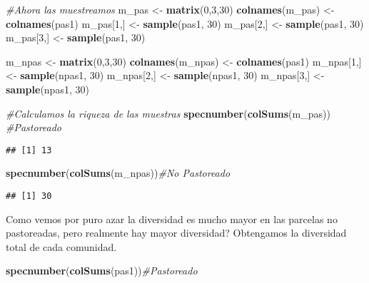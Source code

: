 \documentclass[]{book}
\newenvironment{Shaded}{\begin{snugshade}}{\end{snugshade}}
\newcommand{\KeywordTok}[1]{\textcolor[rgb]{0.13,0.29,0.53}{\textbf{{#1}}}}
\newcommand{\DecValTok}[1]{\textcolor[rgb]{0.00,0.00,0.81}{{#1}}}
\newcommand{\StringTok}[1]{\textcolor[rgb]{0.31,0.60,0.02}{{#1}}}
\newcommand{\CommentTok}[1]{\textcolor[rgb]{0.56,0.35,0.01}{\textit{{#1}}}}
\newcommand{\NormalTok}[1]{{#1}}
\begin{document}
\begin{Shaded}
\begin{Highlighting}[]
\CommentTok{#Ahora las muestreamos}
\NormalTok{m_pas <-}\StringTok{ }\KeywordTok{matrix}\NormalTok{(}\DecValTok{0}\NormalTok{,}\DecValTok{3}\NormalTok{,}\DecValTok{30}\NormalTok{)}
\KeywordTok{colnames}\NormalTok{(m_pas) <-}\StringTok{ }\KeywordTok{colnames}\NormalTok{(pas1)}
\NormalTok{m_pas[}\DecValTok{1}\NormalTok{,] <-}\StringTok{ }\KeywordTok{sample}\NormalTok{(pas1, }\DecValTok{30}\NormalTok{)}
\NormalTok{m_pas[}\DecValTok{2}\NormalTok{,] <-}\StringTok{ }\KeywordTok{sample}\NormalTok{(pas1, }\DecValTok{30}\NormalTok{)}
\NormalTok{m_pas[}\DecValTok{3}\NormalTok{,] <-}\StringTok{ }\KeywordTok{sample}\NormalTok{(pas1, }\DecValTok{30}\NormalTok{)}

\NormalTok{m_npas <-}\StringTok{ }\KeywordTok{matrix}\NormalTok{(}\DecValTok{0}\NormalTok{,}\DecValTok{3}\NormalTok{,}\DecValTok{30}\NormalTok{)}
\KeywordTok{colnames}\NormalTok{(m_npas) <-}\StringTok{ }\KeywordTok{colnames}\NormalTok{(pas1)}
\NormalTok{m_npas[}\DecValTok{1}\NormalTok{,] <-}\StringTok{ }\KeywordTok{sample}\NormalTok{(npas1, }\DecValTok{30}\NormalTok{)}
\NormalTok{m_npas[}\DecValTok{2}\NormalTok{,] <-}\StringTok{ }\KeywordTok{sample}\NormalTok{(npas1, }\DecValTok{30}\NormalTok{)}
\NormalTok{m_npas[}\DecValTok{3}\NormalTok{,] <-}\StringTok{ }\KeywordTok{sample}\NormalTok{(npas1, }\DecValTok{30}\NormalTok{)}

\CommentTok{#Calculamos la riqueza de las muestras}
\KeywordTok{specnumber}\NormalTok{(}\KeywordTok{colSums}\NormalTok{(m_pas)) }\CommentTok{#Pastoreado}
\end{Highlighting}
\end{Shaded}

\begin{verbatim}
## [1] 13
\end{verbatim}

\begin{Shaded}
\begin{Highlighting}[]
\KeywordTok{specnumber}\NormalTok{(}\KeywordTok{colSums}\NormalTok{(m_npas))}\CommentTok{#No Pastoreado}
\end{Highlighting}
\end{Shaded}

\begin{verbatim}
## [1] 30
\end{verbatim}

Como vemos por puro azar la diversidad es mucho mayor en las parcelas no
pastoreadas, pero realmente hay mayor diversidad? Obtengamos la
diversidad total de cada comunidad.

\begin{Shaded}
\begin{Highlighting}[]
\KeywordTok{specnumber}\NormalTok{(}\KeywordTok{colSums}\NormalTok{(pas1))}\CommentTok{#Pastoreado}
\end{Highlighting}
\end{Shaded}
\end{document}
